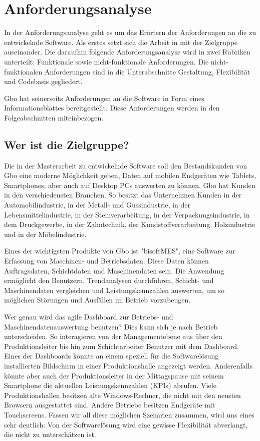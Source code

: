 \chapter{Anforderungsanalyse}
\label{chap:anforderungsanalyse}

In der Anforderungsanalyse geht es um das Erörtern der Anforderungen an die zu entwickelnde Software.
Als erstes setzt sich die Arbeit in  mit der
Zielgruppe auseinander. Die daraufhin folgende Anforderungsanalyse wird in zwei
Rubriken unterteilt: Funktionale sowie nicht-funktionale Anforderungen. Die
nicht-funktionalen Anforderungen sind in die Unterabschnitte Gestaltung, Flexibilität
und Codebasis gegliedert.

Gbo hat seinerseits Anforderungen an die Software in Form eines Informationsblattes
bereitgestellt. Diese Anforderungen werden in den Folgeabschnitten miteinbezogen.

\section{Wer ist die Zielgruppe?}
\label{sec:weristmeinezielgruppe}
Die in der Masterarbeit zu entwickelnde Software
soll den Bestandskunden von Gbo eine moderne Möglichkeit geben, Daten 
auf mobilen Endgeräten wie Tablets, Smartphones, aber auch auf Desktop PCs auswerten zu können.
Gbo hat Kunden in den verschiedensten Branchen. So besitzt das Unternehmen
Kunden in der Automobilindustrie, in der Metall- und Gussindustrie, in der Lebensmittelindustrie,
in der Steinverarbeitung, in der Verpackungsindustrie, in dem Druckgewerbe, in der
Zahntechnik, der Kundstoffverarbeitung, Holzindustrie und in der Möbelindustrie.\cite{GBODatacompBranchenloesungen}

Eines der wichtigsten Produkte von Gbo ist "bisoftMES", eine Software zur Erfassung von
Maschinen- und Betriebsdaten. Diese Daten können Auftragsdaten, Schichtdaten und Maschinendaten sein.
Die Anwendung ermöglicht den Benutzern, Trendanalysen durchführen, Schicht- und Maschinendaten vergleichen und
Leistungskennzahlen auswerten, um so möglichen Störungen und Ausfällen im Betrieb vorzubeugen.

Wer genau wird das agile Dashboard zur Betriebs- und Maschinendatenauswertung
benutzen? Dies kann sich je nach Betrieb unterscheiden. So interagieren von der
Managementebene aus über den Produktionsleiter bis hin zum Schichtarbeiter Benutzer mit dem
Dashboard. Eines der Dashboards könnte an einem speziell für die Softwarelösung
installierten Bildschirm in einer Produktionshalle angezeigt werden. Anderenfalls könnte aber
auch der Produktionsleiter in der Mittagspause mit seinem Smartphone die aktuellen Leistungskennzahlen 
(KPIs) abrufen. Viele Produktionshallen besitzen alte Windows-Rechner, die nicht
mit den neusten Browsern ausgestattet sind. Andere Betriebe besitzen Endgeräte mit Touchscreens.
Fassen wir all diese möglichen Szenarien zusammen, wird uns eines sehr deutlich: Von der
Softwarelösung wird eine gewisse Flexibilität abverlangt, die nicht zu unterschätzen ist.

